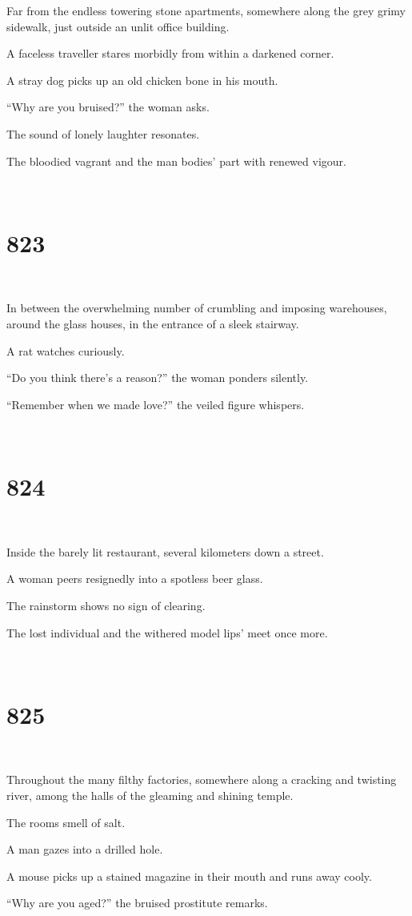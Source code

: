 \documentclass{report}
\begin{document}
Far from the endless towering stone apartments, somewhere along the grey grimy sidewalk, just outside an unlit office building.

A faceless traveller stares morbidly from within a darkened corner.

A stray dog picks up an old chicken bone in his mouth.

``Why are you bruised?'' the woman asks.

The sound of lonely laughter resonates.

The bloodied vagrant and the man bodies' part with renewed vigour.

~
\chapter*{823}
~

In between the overwhelming number of crumbling and imposing warehouses, around the glass houses, in the entrance of a sleek stairway.

A rat watches curiously.

``Do you think there's a reason?'' the woman ponders silently.

``Remember when we made love?'' the veiled figure whispers.

~
\chapter*{824}
~

Inside the barely lit restaurant, several kilometers down a street.

A woman peers resignedly into a spotless beer glass.

The rainstorm shows no sign of clearing.

The lost individual and the withered model lips' meet once more.

~
\chapter*{825}
~

Throughout the many filthy factories, somewhere along a cracking and twisting river, among the halls of the gleaming and shining temple.

The rooms smell of salt.

A man gazes into a drilled hole.

A mouse picks up a stained magazine in their mouth and runs away cooly.

``Why are you aged?'' the bruised prostitute remarks.
\end{document}
